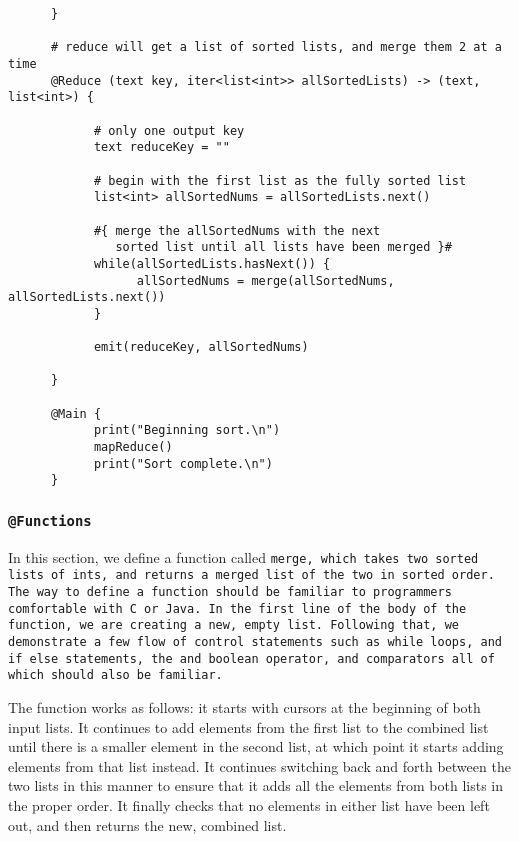 \documentclass{article} \usepackage{fancyhdr, multicol}
\begin{document}
\begin{verbatim}
      }
      
      # reduce will get a list of sorted lists, and merge them 2 at a time
      @Reduce (text key, iter<list<int>> allSortedLists) -> (text, list<int>) {
            
            # only one output key
            text reduceKey = ""
            
            # begin with the first list as the fully sorted list 
            list<int> allSortedNums = allSortedLists.next()
            
            #{ merge the allSortedNums with the next 
               sorted list until all lists have been merged }#
            while(allSortedLists.hasNext()) {
                  allSortedNums = merge(allSortedNums, allSortedLists.next())
            }
            
            emit(reduceKey, allSortedNums)
            
      }
      
      @Main {
            print("Beginning sort.\n")
            mapReduce()
            print("Sort complete.\n")
      }

\end{verbatim}

\subsubsection*{\tt @Functions \rm}

In this section, we define a function called \tt merge\rm, which takes two sorted
\tt list\rm s of \tt int\rm s, and returns a merged \tt list \rm of the two in
sorted order. The way to define a function should be familiar to programmers
comfortable with C or Java. In the first line of the body of the function, we are
creating a new, empty list. Following that, we demonstrate a few flow of control
statements such as \tt while \rm loops, and \tt if else \rm statements, the \tt and
\rm boolean operator, and comparators all of which should also be familiar.

The function works as follows: it starts with cursors at the beginning of both
input lists. It continues to add elements from the first list to the combined list
until there is a smaller element in the second list, at which point it starts
adding elements from that list instead. It continues switching back and forth
between the two lists in this manner to ensure that it adds all the elements from
both lists in the proper order. It finally checks that no elements in either list
have been left out, and then returns the new, combined list.
\end{document}
